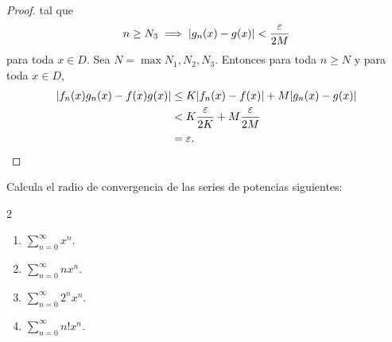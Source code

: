 \documentclass[12pt,a4paper]{article}
\begin{document}
\begin{proof}
        tal que
        \begin{equation*}
            n\geq N_{3}\implies \abs{g_{n}(x)-g(x)}<\frac{\varepsilon}{2M}
        \end{equation*}
        para toda $x\in D$. Sea $N=\max{N_{1},N_{2},N_{3}}$. Entonces para toda $n\geq N$
        y para toda $x\in D$,
        \begin{align*}
            \abs{f_{n}(x)g_{n}(x)-f(x)g(x)}&\leq K\abs{f_{n}(x)-f(x)}+M\abs{g_{n}(x)-g(x)}\\
            &< K\frac{\varepsilon}{2K}+M\frac{\varepsilon}{2M}\\
            &=\varepsilon.
        \end{align*}
    \end{proof}

    \begin{mdframed}[style=mdpinkbox,frametitle={Ejercicio 7}]
        Calcula el radio de convergencia de las series de potencias siguientes:
        \begin{multicols}{2}
            \begin{enumerate}
                \item[(a)] $\sum_{n=0}^{\infty}x^{n}$.
                \item[(b)] $\sum_{n=0}^{\infty}nx^{n}$.
                \item[(c)] $\sum_{n=0}^{\infty}2^{n}x^{n}$.
                \item[(d)] $\sum_{n=0}^{\infty}n!x^{n}$.
            \end{enumerate}
        \end{multicols}
    \end{mdframed}
\end{document}
